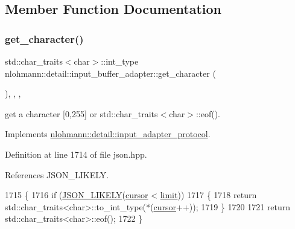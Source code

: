 \subsection{Member Function Documentation}
\mbox{\label{classnlohmann_1_1detail_1_1input__buffer__adapter_ae9e195b04f3551fafb0925aafba00124}} 
\subsubsection{\texorpdfstring{get\+\_\+character()}{get\_character()}}
{\footnotesize\ttfamily std\+::char\+\_\+traits$<$char$>$\+::int\+\_\+type nlohmann\+::detail\+::input\+\_\+buffer\+\_\+adapter\+::get\+\_\+character (\begin{DoxyParamCaption}{ }\end{DoxyParamCaption})\hspace{0.3cm}{\ttfamily [inline]}, {\ttfamily [override]}, {\ttfamily [virtual]}, {\ttfamily [noexcept]}}



get a character \mbox{[}0,255\mbox{]} or std\+::char\+\_\+traits$<$char$>$\+::eof(). 



Implements \hyperlink{structnlohmann_1_1detail_1_1input__adapter__protocol_aac10a6a4048a8ce8e2ed50277692a3ca}{nlohmann\+::detail\+::input\+\_\+adapter\+\_\+protocol}.



Definition at line 1714 of file json.\+hpp.



References J\+S\+O\+N\+\_\+\+L\+I\+K\+E\+LY.


\begin{DoxyCode}
1715     \{
1716         \textcolor{keywordflow}{if} (\hyperlink{json_8hpp_a41ecd1c4cf7c3d56477b9b685b5daa72}{JSON\_LIKELY}(\hyperlink{classnlohmann_1_1detail_1_1input__buffer__adapter_a49e6c8b6555af489a45ef51737eafa1c}{cursor} < \hyperlink{classnlohmann_1_1detail_1_1input__buffer__adapter_a14e1f701754e9cc819af0fc883e6e139}{limit}))
1717         \{
1718             \textcolor{keywordflow}{return} std::char\_traits<char>::to\_int\_type(*(\hyperlink{classnlohmann_1_1detail_1_1input__buffer__adapter_a49e6c8b6555af489a45ef51737eafa1c}{cursor}++));
1719         \}
1720 
1721         \textcolor{keywordflow}{return} std::char\_traits<char>::eof();
1722     \}
\end{DoxyCode}
\mbox{\label{classnlohmann_1_1detail_1_1input__buffer__adapter_a0871125057d993684ba8e45fb2b8a76b}} 
